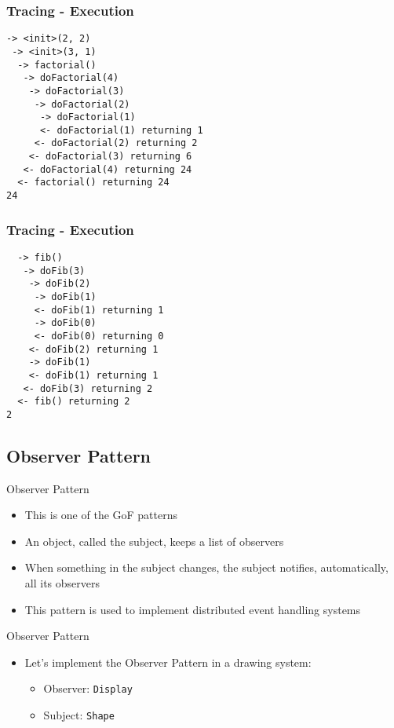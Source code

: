 \documentclass[11pt]{beamer}
\begin{document}
\begin{frame}[fragile]
   \frametitle{Tracing - Execution}
   {\scriptsize
   \begin{lstlisting}
-> <init>(2, 2)
 -> <init>(3, 1)
  -> factorial()
   -> doFactorial(4)
    -> doFactorial(3)
     -> doFactorial(2)
      -> doFactorial(1)
      <- doFactorial(1) returning 1
     <- doFactorial(2) returning 2
    <- doFactorial(3) returning 6
   <- doFactorial(4) returning 24
  <- factorial() returning 24
24
   \end{lstlisting}}
\end{frame}

\begin{frame}[fragile]
   \frametitle{Tracing - Execution}
   {\scriptsize
   \begin{lstlisting}
  -> fib()
   -> doFib(3)
    -> doFib(2)
     -> doFib(1)
     <- doFib(1) returning 1
     -> doFib(0)
     <- doFib(0) returning 0
    <- doFib(2) returning 1
    -> doFib(1)
    <- doFib(1) returning 1
   <- doFib(3) returning 2
  <- fib() returning 2
2
   \end{lstlisting}}
\end{frame}

\subsection*{Observer Pattern}
\begin{frame}{Observer Pattern}
\begin{itemize}
   \item This is one of the GoF patterns
   \item An object, called the subject, keeps a list of observers
   \item When something in the subject changes, the subject notifies, automatically, all its observers
   \item This pattern is used to implement distributed event handling systems
\end{itemize}
\end{frame}

\begin{frame}{Observer Pattern}
\begin{itemize}
   \item Let's implement the Observer Pattern in a drawing system:
      \begin{itemize}
         \item Observer: \texttt{Display}
         \item Subject: \texttt{Shape}
      \end{itemize}
\end{itemize}
\end{frame}
\end{document}
